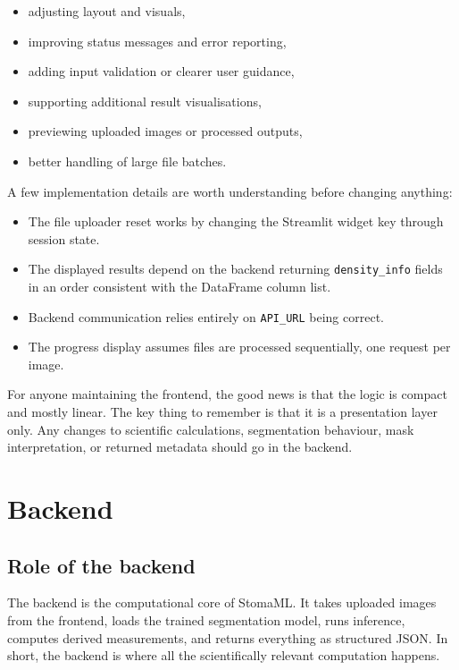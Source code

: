 \documentclass{article}
\begin{document}
\begin{itemize}
    \item adjusting layout and visuals,
    \item improving status messages and error reporting,
    \item adding input validation or clearer user guidance,
    \item supporting additional result visualisations,
    \item previewing uploaded images or processed outputs,
    \item better handling of large file batches.
\end{itemize}

A few implementation details are worth understanding before changing anything:

\begin{itemize}
    \item The file uploader reset works by changing the Streamlit widget key through session state.
    \item The displayed results depend on the backend returning \texttt{density\_info} fields in an order consistent with the DataFrame column list.
    \item Backend communication relies entirely on \texttt{API\_URL} being correct.
    \item The progress display assumes files are processed sequentially, one request per image.
\end{itemize}

For anyone maintaining the frontend, the good news is that the logic is compact and mostly linear. The key thing to remember is that it is a presentation layer only. Any changes to scientific calculations, segmentation behaviour, mask interpretation, or returned metadata should go in the backend.

\section{Backend}

\subsection{Role of the backend}

The backend is the computational core of StomaML. It takes uploaded images from the frontend, loads the trained segmentation model, runs inference, computes derived measurements, and returns everything as structured JSON. In short, the backend is where all the scientifically relevant computation happens.
\end{document}
